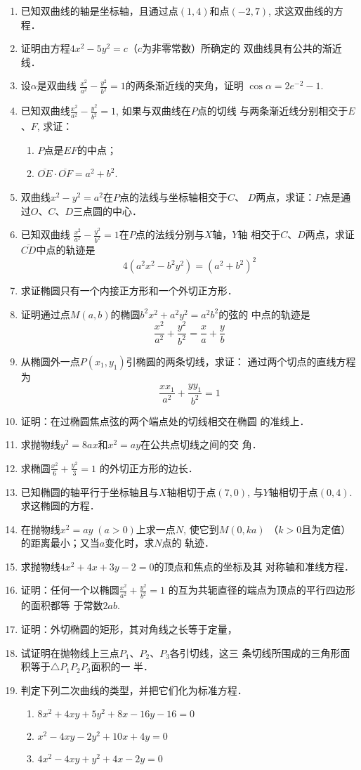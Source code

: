 \begin{enumerate}
\item 已知双曲线的轴是坐标轴，且通过点$(1,4)$和点$(-2,
7)$, 求这双曲线的方程．
\item 证明由方程$4x^2-5y^2=c$（$c$为非零常数）所确定的
双曲线具有公共的渐近线．
\item 设$\alpha$是双曲线
$\frac{x^2}{a^2}-\frac{y^2}{b^2}=1$的两条渐近线的夹角，证明
$\cos\alpha=2e^{-2}-1$.
\item 已知双曲线$\frac{x^2}{a^2}-\frac{y^2}{b^2}=1$, 如果与双曲线在$P$点的切线
与两条渐近线分别相交于$E$、$F$, 求证：
\begin{enumerate}
    \item $P$点是$EF$的中点；
    \item $\overline{OE}\cdot \overline{OF}=a^2+b^2$.
\end{enumerate}

\item 双曲线$x^2-y^2=a^2$在$P$点的法线与坐标轴相交于$C$、
$D$两点，求证：$P$点是通过$O$、$C$、$D$三点圆的中心．
\item 已知双曲线
$\frac{x^2}{a^2}-\frac{y^2}{b^2}=1$在$P$点的法线分别与$X$轴，$Y$轴
相交于$C$、$D$两点，求证$\overline{CD}$中点的轨迹是
\[4(a^2x^2-b^2y^2)=(a^2+b^2)^2\]
\item 求证椭圆只有一个内接正方形和一个外切正方形．
\item 证明通过点$M(a,b)$的椭圆$b^2x^2+a^2y^2=a^2b^2$的弦的
中点的轨迹是
\[\frac{x^2}{a^2}+\frac{y^2}{b^2}=\frac{x}{a}+\frac{y}{b}\]
\item 从椭圆外一点$P(x_1,y_1)$引椭圆的两条切线，求证：
通过两个切点的直线方程为
\[\frac{xx_1}{a^2}+\frac{yy_1}{b^2}=1\]

\item 证明：在过椭圆焦点弦的两个端点处的切线相交在椭圆
的准线上．
\item 求抛物线$y^2=8ax$和$x^2=ay$在公共点切线之间的交
角．
\item 求椭圆$\frac{x^2}{6}+\frac{y^2}{3}=1$
的外切正方形的边长．
\item 已知椭圆的轴平行于坐标轴且与$X$轴相切于点$(7,0)$, 
与$Y$轴相切于点$(0,4)$. 求这椭圆的方程．
\item 在抛物线$x^2=ay\; (a>0)$上求一点$N$, 使它到$M(0,ka)$
（$k>0$且为定值）的距离最小；又当$a$变化时，求$N$点的
轨迹．
\item 求抛物线$4x^2+4x+3y-2=0$的顶点和焦点的坐标及其
对称轴和准线方程．
\item 证明：任何一个以椭圆$\frac{x^2}{a^2}+\frac{y^2}{b^2}=1$
的互为共轭直径的端点为顶点的平行四边形的面积都等
于常数$2ab$. 
\item 证明：外切椭圆的矩形，其对角线之长等于定量，
\item 试证明在抛物线上三点$P_1$、$P_2$、$P_3$各引切线，这三
条切线所围成的三角形面积等于$\triangle P_1P_2P_3$面积的一
半．
\item 判定下列二次曲线的类型，并把它们化为标准方程．
\begin{enumerate}
    \item $8x^2+4xy+5y^2+8x-16y-16=0$
    \item $x^2-4xy-2y^2+10x+4y=0$
    \item $4x^2-4xy+y^2+4x-2y=0$
\end{enumerate}
\end{enumerate}


